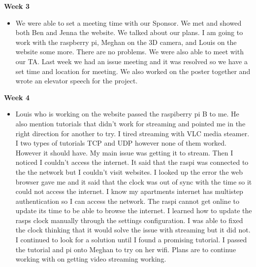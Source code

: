             \textbf{Week 3}
            \begin{itemize}
                \item We were able to set a meeting time with our Sponsor. We met and showed both Ben and Jenna the website. We talked about our plans. I am going to work with the raspberry pi, Meghan on the 3D camera, and Louis on the website some more. There are no problems. We were also able to meet with our TA. Last week we had an issue meeting and it was resolved so we have a set time and location for meeting. We also worked on the poster together and wrote an elevator speech for the project.
            \end{itemize}
            \newpage
            \textbf{Week 4}
            \begin{itemize}
                \item Louis who is working on the website passed the raspiberry pi B to me. He also mention tutorials that didn't work for streaming and pointed me in the right direction for another to try. I tired streaming with VLC media steamer. I two types of tutorials TCP and UDP however none of them worked. However it should have. My main issue was getting it to stream. Then I noticed I couldn't access the internet. It said that the raspi was connected to the the network but I couldn't visit websites. I looked up the error the web browser gave me and it said that the clock was out of sync with the time so it could not access the internet. I know my apartments internet has multistep authentication so I can access the network. The raspi cannot get online to update its time to be able to browse the internet. I learned how to update the rasps clock manually through the settings configuration. I was able to fixed the clock thinking that it would solve the issue with streaming but it did not. I continued to look for a solution until I found a promising tutorial. I passed the tutorial and pi onto Meghan to try on her wifi. Plans are to continue working with on getting video streaming working. 
            \end{itemize}
            

